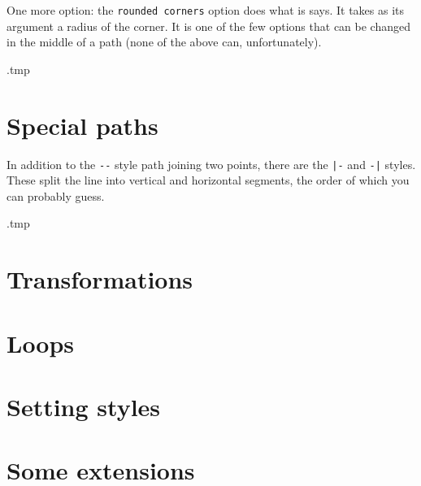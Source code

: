 One more option: the \verb|rounded corners| option does what is says.
It takes as its argument a radius of the corner.
It is one of the few options that can be changed in the middle of a path
(none of the above can, unfortunately).
%
\begin{VerbatimOut}{\jobname.tmp}
\end{VerbatimOut}
\ShowExample



%
%
%
\section{Special paths}

In addition to the \verb|--| style path joining two points,
there are the \verb$|-$ and \verb$-|$ styles.
These split the line into vertical and horizontal segments,
the order of which you can probably guess.
%
\begin{VerbatimOut}{\jobname.tmp}
\end{VerbatimOut}
\ShowExample





%
%
\section{Transformations}



%
%
\section{Loops}


%
%
\section{Setting styles}


%
%
\section{Some extensions}

